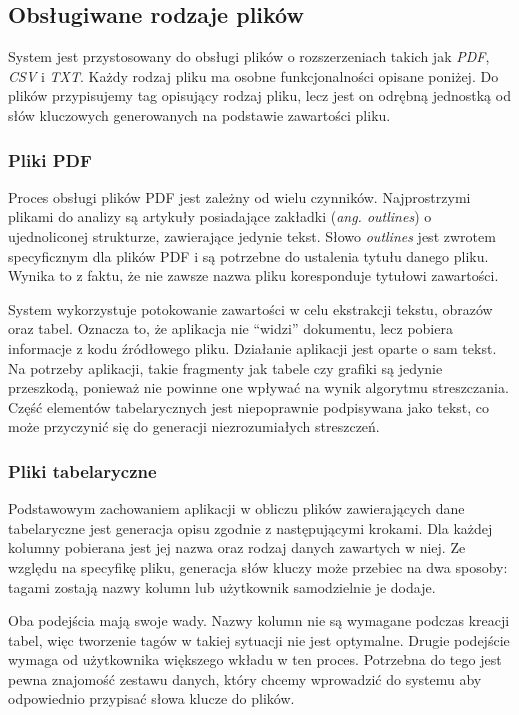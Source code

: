 \documentclass[12pt,a4paper,twoside]{article}
\begin{document}
\subsection{Obsługiwane rodzaje plików}
System jest przystosowany do obsługi plików o rozszerzeniach takich jak \textit{PDF}, \textit{CSV} i \textit{TXT}. Każdy rodzaj pliku ma osobne funkcjonalności opisane poniżej. Do plików przypisujemy tag opisujący rodzaj pliku, lecz jest on odrębną jednostką od słów kluczowych generowanych na podstawie zawartości pliku.
\subsubsection*{Pliki PDF}
Proces obsługi plików PDF jest zależny od wielu czynników. Najprostrzymi plikami do analizy są artykuły posiadające zakładki (\textit{ang. outlines}) o ujednoliconej strukturze, zawierające jedynie tekst. Słowo \textit{outlines} jest zwrotem specyficznym dla plików PDF i są potrzebne do ustalenia tytułu danego pliku. Wynika to z faktu, że nie zawsze nazwa pliku koresponduje tytułowi zawartości.\par
System wykorzystuje potokowanie zawartości w celu ekstrakcji tekstu, obrazów oraz tabel. Oznacza to, że aplikacja nie ``widzi'' dokumentu, lecz pobiera informacje z kodu źródłowego pliku. Działanie aplikacji jest oparte o sam tekst. Na potrzeby aplikacji, takie fragmenty jak tabele czy grafiki są jedynie przeszkodą, ponieważ nie powinne one wpływać na wynik algorytmu streszczania. Część elementów tabelarycznych jest niepoprawnie podpisywana jako tekst, co może przyczynić się do generacji niezrozumiałych streszczeń. 
\subsubsection*{Pliki tabelaryczne}
Podstawowym zachowaniem aplikacji w obliczu plików zawierających dane tabelaryczne jest generacja opisu zgodnie z następującymi krokami. Dla każdej kolumny pobierana jest jej nazwa oraz rodzaj danych zawartych w niej. Ze względu na specyfikę pliku, generacja słów kluczy może przebiec na dwa sposoby: tagami zostają nazwy kolumn lub użytkownik samodzielnie je dodaje.\par
Oba podejścia mają swoje wady. Nazwy kolumn nie są wymagane podczas kreacji tabel, więc tworzenie tagów w takiej sytuacji nie jest optymalne. Drugie podejście wymaga od użytkownika większego wkładu w ten proces. Potrzebna do tego jest pewna znajomość zestawu danych, który chcemy wprowadzić do systemu aby odpowiednio przypisać słowa klucze do plików.
\end{document}
